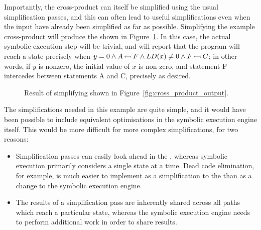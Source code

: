 
 Importantly, the cross-product
     {\StateMachine} can itself be simplified using the usual
     {\StateMachine} simplification passes, and this can often lead to
     useful simplifications even when the input {\StateMachines} have
     already been simplified as far as possible.  Simplifying the
     example cross-product {\StateMachine} will produce the
     {\StateMachine} shown in
     Figure~\ref{fig:cross_product_output_opt}.  In this case, the
     actual symbolic execution step will be trivial, and will report
     that the program will reach a {\stCrash} state precisely when
     $y = 0 \wedge A\,{\leftarrowtail}\,F \wedge LD(x) \not= 0 \wedge
     F\,{\leftarrowtail}\,C$; in other words, if $y$ is nonzero, the
     initial value of $x$ is non-zero, and statement F intercedes
     between statements A and C, precisely as desired.

\begin{figure}
  \begin{centering}
  \end{centering}
  \caption{Result of simplifying {\StateMachine} shown in
    Figure~\ref{fig:cross_product_output}.}
  \label{fig:cross_product_output_opt}
\end{figure}

The simplifications needed in this example are quite simple, and it
would have been possible to include equivalent optimisations in the
symbolic execution engine itself.  This would be more difficult for
more complex simplifications, for two reasons:

\begin{itemize}
\item Simplification passes can easily look ahead in the
  {\StateMachine}, whereas symbolic execution primarily considers a
  single state at a time.  Dead code elimination, for example, is much
  easier to implement as a simplification to the {\StateMachine} than
  as a change to the symbolic execution engine.
\item The results of a simplification pass are inherently shared
  across all paths which reach a particular state, whereas the
  symbolic execution engine needs to perform additional work in order
  to share results.
\end{itemize}


